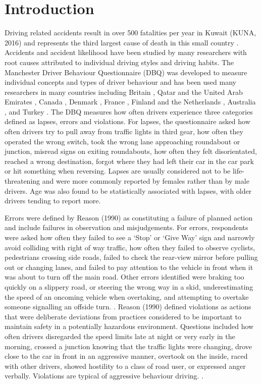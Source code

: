 \documentclass[preprint,12pt,a4paper,authoryear]{elsarticle}
\begin{document}
\section{Introduction}
Driving related accidents result in over 500 fatalities per year in Kuwait (KUNA, 2016) and represents the third largest cause of death in this small country \citep{Wang2016}. Accidents and accident likelihood have been studied by many researchers with root causes attributed to individual driving styles and driving habits.  The Manchester Driver Behaviour Questionnaire (DBQ) was developed to measure individual concepts and types of driver behaviour and has been used many researchers in many countries including Britain \citep{Reason1990}, Qatar and the United Arab Emirates \citep{Bener2008}, Canada \citep{Cordazzo2014}, Denmark \citep{Martinussen2013}, France \citep{Gu2014}, Finland and the Netherlands \citep{Lajunen2004}, Australia \citep{Stephens2016}, and Turkey \citep{Sumer2003}. 
The DBQ measures how often drivers experience three categories defined as lapses, errors and violations. For lapses, the questionnaire asked how often drivers try to pull away from traffic lights in third gear, how often they operated the wrong switch, took the wrong lane approaching roundabout or junction, misread signs on exiting roundabouts, how often they felt disorientated, reached a wrong destination, forgot where they had left their car in the car park or hit something when reversing. Lapses are usually considered not to be life-threatening and were more commonly reported by females rather than by male drivers. Age was also found to be statistically associated with lapses, with older drivers tending to report more. 

Errors were defined by Reason (1990) as constituting a failure of planned action and include failures in observation and misjudgements. For errors, respondents were asked how often they failed to see a `Stop' or `Give Way' sign and narrowly avoid colliding with right of way traffic, how often they failed to observe cyclists, pedestrians crossing side roads, failed to check the rear-view mirror before pulling out or changing lanes, and failed to pay attention to the vehicle in front when it was about to turn off the main road. Other errors identified were braking too quickly on a slippery road, or steering the wrong way in a skid, underestimating the speed of an oncoming vehicle when overtaking, and attempting to overtake someone signalling an offside turn. \citep{Reason1990}. 
Reason (1990) defined violations as  actions that were deliberate deviations from practices considered to be important to maintain safety in a potentially hazardous environment. Questions included how often drivers disregarded the speed limits late at night or very early in the morning, crossed a junction knowing that the traffic lights were changing, drove close to the car in front in an aggressive manner, overtook on the inside, raced with other drivers, showed hostility to a class of road user, or expressed anger verbally. Violations are typical of aggressive behaviour driving. \citep{Reason1990}. 
\end{document}
